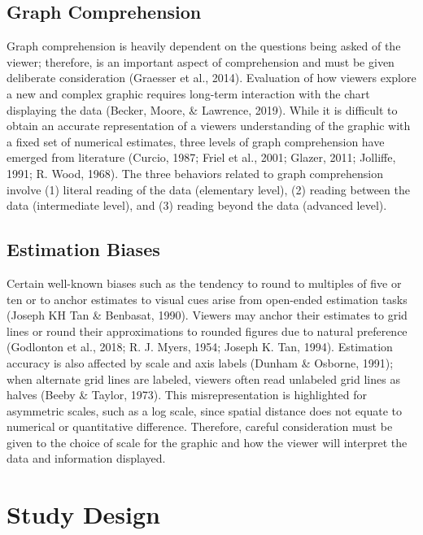 \documentclass[print]{nuthesis}
\begin{document}
\hypertarget{graph-comprehension-1}{%
\subsection{Graph Comprehension}\label{graph-comprehension-1}}

Graph comprehension is heavily dependent on the questions being asked of the viewer; therefore,  is an important aspect of comprehension and must be given deliberate consideration (Graesser et al., 2014).
Evaluation of how viewers explore a new and complex graphic requires long-term interaction with the chart displaying the data (Becker, Moore, \& Lawrence, 2019).
While it is difficult to obtain an accurate representation of a viewers understanding of the graphic with a fixed set of numerical estimates, three levels of graph comprehension have emerged from literature (Curcio, 1987; Friel et al., 2001; Glazer, 2011; Jolliffe, 1991; R. Wood, 1968).
The three behaviors related to graph comprehension involve (1) literal reading of the data (elementary level), (2) reading between the data (intermediate level), and (3) reading beyond the data (advanced level).

\hypertarget{estimation-biases-1}{%
\subsection{Estimation Biases}\label{estimation-biases-1}}

Certain well-known biases such as the tendency to round to multiples of five or ten or to anchor estimates to visual cues arise from open-ended estimation tasks (Joseph KH Tan \& Benbasat, 1990).
Viewers may anchor their estimates to grid lines or round their approximations to rounded figures due to natural preference (Godlonton et al., 2018; R. J. Myers, 1954; Joseph K. Tan, 1994).
Estimation accuracy is also affected by scale and axis labels (Dunham \& Osborne, 1991); when alternate grid lines are labeled, viewers often read unlabeled grid lines as halves (Beeby \& Taylor, 1973).
This misrepresentation is highlighted for asymmetric scales, such as a log scale, since spatial distance does not equate to numerical or quantitative difference.
Therefore, careful consideration must be given to the choice of scale for the graphic and how the viewer will interpret the data and information displayed.

\hypertarget{study-design-2}{%
\section{Study Design}\label{study-design-2}}
\end{document}
